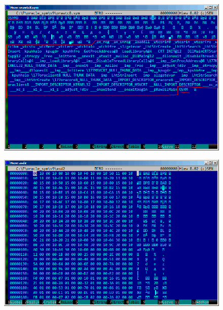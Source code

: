 \begin{figure}[H]
\centering
\includegraphics[scale=\FigScale]{ff/Oracle_SYM/whole2.png}
\caption{}
\label{fig:oracle_SYM_whole2}
\end{figure}

\begin{figure}[H]
\centering
\includegraphics[scale=\FigScale]{ff/Oracle_SYM/binary1.png}
\caption{}
\label{fig:oracle_SYM_binary1}
\end{figure}

